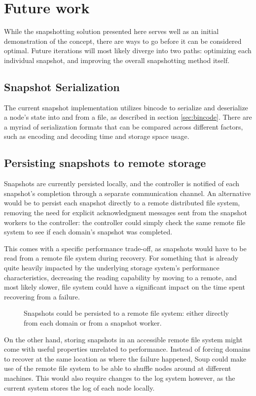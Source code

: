 \documentclass[b5paper]{report}
\begin{document}
\section{Future work}
While the snapshotting solution presented here serves well as an
initial demonstration of the concept, there are ways to go before it can be
considered optimal. Future iterations will most likely diverge into two paths:
optimizing each individual snapshot, and improving the overall snapshotting
method itself.

\subsection{Snapshot Serialization}
The current snapshot implementation utilizes bincode \cite{bincode} to serialize
and deserialize a node's state into and from a file, as described in section
\ref{sec:bincode}. There are a myriad of serialization formats that can be
compared across different factors, such as encoding and decoding time and
storage space usage.

\subsection{Persisting snapshots to remote storage}
Snapshots are currently persisted locally, and the controller is notified of
each snapshot's completion through a separate communication channel. An
alternative would be to persist each snapshot directly to a remote distributed
file system, removing the need for explicit acknowledgment messages sent from
the snapshot workers to the controller: the controller could simply check the
same remote file system to see if each domain's snapshot was completed.

This comes with a specific performance trade-off, as snapshots would have to be
read from a remote file system during recovery. For something that is already
quite heavily impacted by the underlying storage system's performance
characteristics, decreasing the reading capability by moving to a remote, and
most likely slower, file system could have a significant impact on the time
spent recovering from a failure.

\begin{figure}[H]
  
  \caption{
    Snapshots could be persisted to a remote file system: either directly from
    each domain or from a snapshot worker.
  }
\end{figure}

On the other hand, storing snapshots in an accessible remote file system might
come with useful properties unrelated to performance. Instead of forcing domains
to recover at the same location as where the failure happened, Soup could make
use of the remote file system to be able to shuffle nodes around at different
machines. This would also require changes to the log system however, as the
current system stores the log of each node locally.
\end{document}
